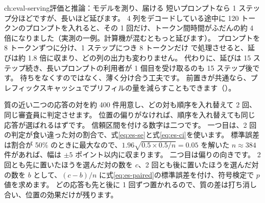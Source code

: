 \begin{answers}{ch:eval-serving}{評価と推論：モデルを測り、届ける}
短いプロンプトなら 1 ステップ分ほどですが、長いほど延びます。
4 列をデコードしている途中に 120 トークンのプロンプトを入れると、その 1 回だけ、トークン間時間がふだんの約 4 倍になりました（実測の一例。計算機が混むともっと延びます）。
プロンプトを 8 トークンずつに分け、1 ステップにつき 8 トークンだけ  で処理させると、延びは約 1.8 倍に収まり、どの列の出力も変わりません。
代わりに、延びは 15 ステップ続き、長いプロンプトの利用者が 1 個目を受け取るのも 15 ステップ後です。
待ちをなくすのではなく、薄く分け合う工夫です。
前置きが共通なら、プレフィックスキャッシュでプリフィルの量を減らすこともできます（）。
\item 質の近い二つの応答の対を約 400 件用意し、どの対も順序を入れ替えて 2 回、同じ審査員に判定させます。
位置の偏りがなければ、順序を入れ替えても同じ応答が選ばれるはずです。
信頼区間を付ける数字は二つです。
一つ目は、2 回の判定が食い違った対の割合で、式\eqref{eq:es-se}と式\eqref{eq:es-ci}を使います。
標準誤差は割合が 50\% のときに最大なので、$1.96\sqrt{0.5\times0.5/n}=0.05$ を解いた $n\approx384$ 件があれば、幅は $\pm5$ ポイント以内に収まります。
二つ目は偏りの向きです。
2 回とも先に置いたほうを選んだ対の数を $c$、2 回とも後に置いたほうを選んだ対の数を $b$ として、$(c-b)/n$ に式\eqref{eq:es-paired}の標準誤差を付け、符号検定で $p$ 値を求めます。
どの応答も先と後に 1 回ずつ置かれるので、質の差は打ち消し合い、位置の効果だけが残ります。
\end{answers}
